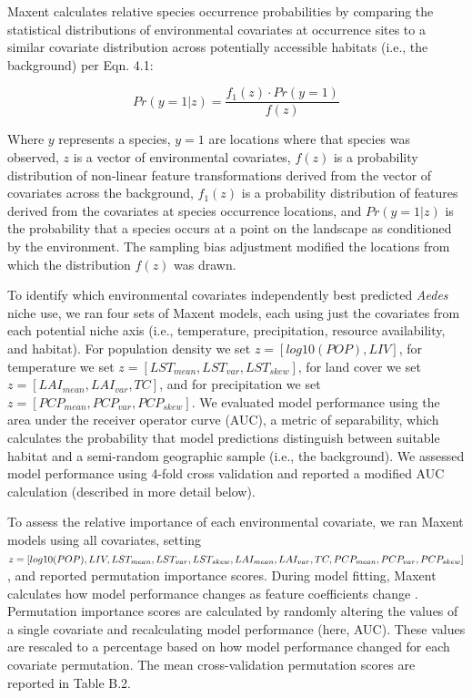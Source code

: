 Maxent calculates relative species occurrence probabilities by comparing the statistical distributions of environmental covariates at occurrence sites to a similar covariate distribution across potentially accessible habitats (i.e., the background) per Eqn. 4.1:

\begin{equation}
Pr(y=1|z) = 
\frac{f_1(z) \cdot Pr(y=1)}{f(z)}
\end{equation}

Where $y$ represents a species, $y=1$ are locations where that species was observed, $z$ is a vector of environmental covariates, $f(z)$ is a probability distribution of non-linear feature transformations derived from the vector of covariates across the background, $f_1(z)$ is a probability distribution of features derived from the covariates at species occurrence locations, and $Pr(y=1|z)$ is the probability that a species occurs at a point on the landscape as conditioned by the environment. The sampling bias adjustment modified the locations from which the distribution $f(z)$ was drawn.

To identify which environmental covariates independently best predicted \textit{Aedes} niche use, we ran four sets of Maxent models, each using just the covariates from each potential niche axis (i.e., temperature, precipitation, resource availability, and habitat). For population density we set $z = [log10(POP), LIV]$, for temperature we set $z = [LST_{mean}, LST_{var}, LST_{skew}]$, for land cover we set $z = [LAI_{mean}, LAI_{var}, TC]$, and for precipitation we set $z = [PCP_{mean}, PCP_{var}, PCP_{skew}]$. We evaluated model performance using the area under the receiver operator curve (AUC), a metric of separability, which calculates the probability that model predictions distinguish between suitable habitat and a semi-random geographic sample (i.e., the background). We assessed model performance using 4-fold cross validation and reported a modified AUC calculation (described in more detail below).

To assess the relative importance of each environmental covariate, we ran Maxent models using all covariates, setting $z = [log10(POP), LIV, LST_{mean}, LST_{var}, LST_{skew}, LAI_{mean}, LAI_{var}, TC, PCP_{mean}, PCP_{var},\\ PCP_{skew}]$, and reported permutation importance scores. During model fitting, Maxent calculates how model performance changes as feature coefficients change \cite{Phillips2008-ic}. Permutation importance scores are calculated by randomly altering the values of a single covariate and recalculating model performance (here, AUC). These values are rescaled to a percentage based on how model performance changed for each covariate permutation. The mean cross-validation permutation scores are reported in Table B.2.

